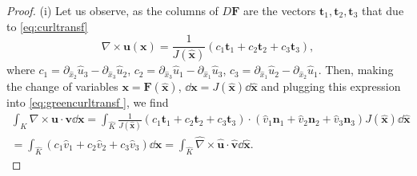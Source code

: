 \begin{proof}
(i) Let us observe, as the columns of $D \mathbf{F}$ are the vectors $ \mathbf{t}_1,  \mathbf{t}_2, \mathbf{t}_3$ that due to \eqref{eq:curltransf} 
$$ \nabla\times \mathbf{u} ( \mathbf{x}) = \frac{1}{J( \hat{\mathbf{x}})}  \left( 
c_1 \mathbf{t}_1 + c_2 \mathbf{t}_2 + c_3 \mathbf{t}_3
\right),$$
where $c_1 = \partial_{ \hat{x}_2} \hat{u}_3 -  \partial_{ \hat{x}_3} \hat{u}_2$,
$c_2 = \partial_{ \hat{x}_3} \hat{u}_1 -  \partial_{ \hat{x}_1} \hat{u}_3$,
$c_3 = \partial_{ \hat{x}_1} \hat{u}_2 -  \partial_{ \hat{x}_2} \hat{u}_1$.
Then, making the change of variables $ \mathbf{x}= \mathbf{F}( \hat{\mathbf{x}})$, $\dd \mathbf{x} = J( \hat{\mathbf{x}})\dd \hat{\mathbf{x}}$ and  
 plugging this expression into \eqref{eq:greencurltransf }, we find
\begin{multline*}
 \int_K \nabla\times \mathbf{u}\cdot \mathbf{v} \dd \mathbf{x} = \int_{\hat{K}}   
 \frac{1}{J( \hat{\mathbf{x}})} (c_1 \mathbf{t}_1 + c_2 \mathbf{t}_2 + c_3 \mathbf{t}_3 ) \cdot
 (\hat{v}_1 \mathbf{n}_1+ \hat{v}_2 \mathbf{n}_2 + \hat{v}_3 \mathbf{n}_3)
J( \hat{\mathbf{x}}) \dd \hat{\mathbf{x}} \\
=  \int_{\hat{K}}  (c_1\hat{v}_1 + c_2\hat{v}_2+c_3\hat{v}_3)\dd \hat{\mathbf{x}} 
= \int_{\hat{K}} \hat{\nabla} \times \hat{\mathbf{u}} \cdot \hat{\mathbf{v}} \dd \hat{\mathbf{x}}. 
\end{multline*}


\end{proof}
